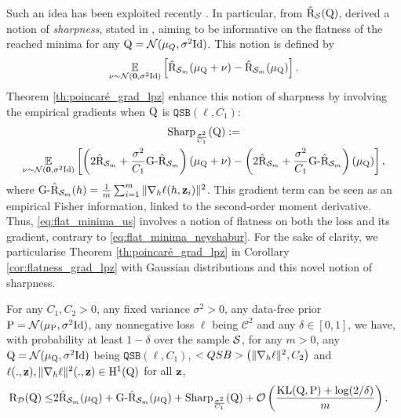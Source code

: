 Such an idea has been exploited recently \citep{neyshabur2017explor,jiang2020fantastic,dziugaite2020search}.
In particular, from $\hat{\Risk}_\S(\Q)$, \citet{neyshabur2017explor} derived a notion of \emph{sharpness}, stated in , aiming to be informative on the flatness of the reached minima for any $\Q= \Ncal(\mu_Q,\sigma^2 \mathrm{Id})$.
This notion is defined by 
\begin{equation}
  \label{eq:flat_minima_neyshabur}
  \EE_{\nu\sim \Ncal(\mathbf{0},\sigma^2 \mathrm{Id})} \LB \hat{\Risk}_{\S_m}(\mu_\Q + \nu) -  \hat{\Risk}_{\S_m}(\mu_\Q) \RB.
\end{equation}
Theorem \ref{th:poincaré_grad_lpz} enhance this notion of sharpness by involving the empirical gradients when $\Q$ is $\texttt{QSB}(\ell,C_1)$: 
\begin{multline}
  \label{eq:flat_minima_us}
  \textrm{Sharp}_{\frac{\sigma^2}{C_1}}(\Q):=\\
   \EE_{\nu\sim \Ncal(\mathbf{0},\sigma^2 \mathrm{Id})} \LB \LP2\hat{\Risk}_{\S_m} + \frac{\sigma^2}{C_1}\textrm{G-}\hat{\Risk}_{\S_m}\RP(\mu_\Q + \nu)  -  \LP2\hat{\Risk}_{\S_m} + \frac{\sigma^2}{C_1}\textrm{G-}\hat{\Risk}_{\S_m}\RP(\mu_\Q) \RB ,
\end{multline}
where $\textrm{G-}\hat{\Risk}_{\S_m}(h) = \frac{1}{m}\sum_{i=1}^m\|\nabla_h \ell(h, \z_i)\|^2$.
This gradient term can be seen as an empirical Fisher information, linked to the second-order moment derivative.
Thus, \eqref{eq:flat_minima_us} involves a notion of flatness on both the loss and its gradient, contrary to \eqref{eq:flat_minima_neyshabur}.
For the sake of clarity, we particularise Theorem \ref{th:poincaré_grad_lpz} in Corollary \ref{cor:flatness_grad_lpz} with Gaussian distributions and this novel notion of sharpness.
\begin{corollary}\label{cor:flatness_grad_lpz}
For any $C_1,C_2>0$, any fixed variance $\sigma^2>0$, any data-free prior $\P=\Ncal(\mu_\P,\sigma^2 \mathrm{Id})$, any nonnegative loss $\ell$ being $\mathcal{C}^2$ and any $\delta\in [0,1]$, we have, with probability at least $1-\delta$ over the sample $\S$, for any $m>0$, any $\Q= \mathcal{N}(\mu_\Q,\sigma^2 \mathrm{Id})$ being $\texttt{QSB}(\ell,C_1)$, $\texttt{QSB}\LP\|\nabla_h \ell\|^2,C_2\RP$ and $\ell(.,\z),\|\nabla_h \ell\|^2(.,\z)\in \mathrm{H}^{1}(\Q)$ for all $\z$, 
\begin{align*}
\Risk_{\D}(\Q) \leq & 2 \hat{\Risk}_{\S_m}(\mu_\Q) + \textrm{G-}\hat{\Risk}_{\S_m}(\mu_\Q) + \textrm{Sharp}_{\frac{\sigma^2}{C_1}}(\Q) + \mathcal{O}\LP\frac{\KL(\Q,\P) +\log(2/\delta)}{ m}\RP.
\end{align*}
\end{corollary}
  

